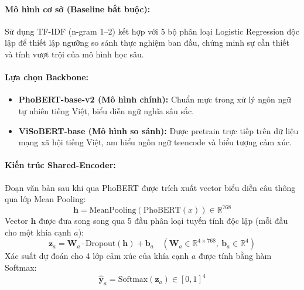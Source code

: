 \documentclass[11pt,a4paper]{article}
\begin{document}
\paragraph{Mô hình cơ sở (Baseline bắt buộc):}
Sử dụng TF-IDF (n-gram 1--2) kết hợp với 5 bộ phân loại Logistic Regression độc lập để thiết lập ngưỡng so sánh thực nghiệm ban đầu, chứng minh sự cần thiết và tính vượt trội của mô hình học sâu.

\paragraph{Lựa chọn Backbone:}
\begin{itemize}
    \item \textbf{PhoBERT-base-v2 (Mô hình chính):} Chuẩn mực trong xử lý ngôn ngữ tự nhiên tiếng Việt, biểu diễn ngữ nghĩa sâu sắc.
    \item \textbf{ViSoBERT-base (Mô hình so sánh):} Được pretrain trực tiếp trên dữ liệu mạng xã hội tiếng Việt, am hiểu ngôn ngữ teencode và biểu tượng cảm xúc.
\end{itemize}

\paragraph{Kiến trúc Shared-Encoder:}
Đoạn văn bản sau khi qua PhoBERT được trích xuất vector biểu diễn câu thông qua lớp Mean Pooling:
\begin{equation}
    \mathbf{h} = \text{MeanPooling}(\text{PhoBERT}(x)) \in \mathbb{R}^{768}
\end{equation}
Vector $\mathbf{h}$ được đưa song song qua 5 đầu phân loại tuyến tính độc lập (mỗi đầu cho một khía cạnh $a$):
\begin{equation}
    \mathbf{z}_a = \mathbf{W}_a \cdot \text{Dropout}(\mathbf{h}) + \mathbf{b}_a \quad (\mathbf{W}_a \in \mathbb{R}^{4 \times 768}, \ \mathbf{b}_a \in \mathbb{R}^4)
\end{equation}
Xác suất dự đoán cho 4 lớp cảm xúc của khía cạnh $a$ được tính bằng hàm Softmax:
\begin{equation}
    \hat{\mathbf{y}}_a = \text{Softmax}(\mathbf{z}_a) \in [0, 1]^4
\end{equation}
\end{document}
